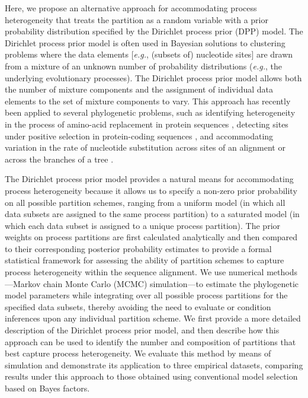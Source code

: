 \documentclass[11pt]{article}
\begin{document}
Here, we propose an alternative approach for accommodating process heterogeneity that treats the partition as a random variable with a prior probability distribution specified by the Dirichlet process prior (DPP) model.
The Dirichlet process prior model is often used in Bayesian solutions to clustering problems where the data elements [{\it e.g.}, (subsets of) nucleotide sites] are drawn from a mixture of an unknown number of probability distributions ({\it e.g.}, the underlying evolutionary processes).
The Dirichlet process prior model allows both the number of mixture components and the assignment of individual data elements to the set of mixture components to vary.
This approach has recently been applied to several phylogenetic problems, such as identifying 
heterogeneity in the process of amino-acid replacement in protein sequences \citep{lartillot04}, detecting sites under positive selection in protein-coding sequences \citep{huelsenbeck06}, and accommodating variation in the rate of nucleotide substitution across sites of an alignment \citep{huelsenbeck07b} or across the branches of a tree \citep{heath11}.

The Dirichlet process prior model provides a natural means for accommodating process heterogeneity because it allows us to specify a non-zero prior probability on all possible partition schemes, ranging from a uniform model (in which all data subsets are assigned to the same process partition) to a saturated model (in which each data subset is assigned to a unique process partition).
The prior weights on process partitions are first calculated analytically and then compared to their corresponding posterior probability estimates to provide a formal statistical framework for assessing the ability of partition schemes to capture process heterogeneity within the sequence alignment.
We use numerical methods---Markov chain Monte Carlo (MCMC) simulation---to estimate the phylogenetic model parameters while integrating over all possible process partitions for the specified data subsets, thereby avoiding the need to evaluate or condition inferences upon any individual partition scheme. 
We first provide a more detailed description of the Dirichlet process prior model, and then describe how this approach can be used to identify the number and composition of partitions that best capture process heterogeneity.
We evaluate this method by means of simulation and demonstrate its application to three empirical datasets, comparing results under this approach to those obtained using conventional model selection based on Bayes factors.
\end{document}
